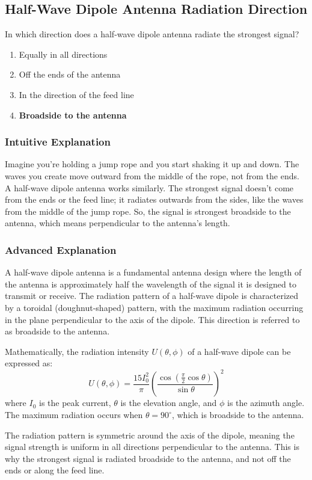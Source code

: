 \subsection{Half-Wave Dipole Antenna Radiation Direction}
\label{T9A10}

\begin{tcolorbox}[colback=gray!10!white,colframe=black!75!black,title=T9A10]
In which direction does a half-wave dipole antenna radiate the strongest signal?
\begin{enumerate}[label=\Alph*)]
    \item Equally in all directions
    \item Off the ends of the antenna
    \item In the direction of the feed line
    \item \textbf{Broadside to the antenna}
\end{enumerate}
\end{tcolorbox}

\subsubsection*{Intuitive Explanation}
Imagine you’re holding a jump rope and you start shaking it up and down. The waves you create move outward from the middle of the rope, not from the ends. A half-wave dipole antenna works similarly. The strongest signal doesn’t come from the ends or the feed line; it radiates outwards from the sides, like the waves from the middle of the jump rope. So, the signal is strongest broadside to the antenna, which means perpendicular to the antenna’s length.

\subsubsection*{Advanced Explanation}
A half-wave dipole antenna is a fundamental antenna design where the length of the antenna is approximately half the wavelength of the signal it is designed to transmit or receive. The radiation pattern of a half-wave dipole is characterized by a toroidal (doughnut-shaped) pattern, with the maximum radiation occurring in the plane perpendicular to the axis of the dipole. This direction is referred to as broadside to the antenna.

Mathematically, the radiation intensity \( U(\theta, \phi) \) of a half-wave dipole can be expressed as:
\[
U(\theta, \phi) = \frac{15 I_0^2}{\pi} \left( \frac{\cos\left(\frac{\pi}{2} \cos \theta\right)}{\sin \theta} \right)^2
\]
where \( I_0 \) is the peak current, \( \theta \) is the elevation angle, and \( \phi \) is the azimuth angle. The maximum radiation occurs when \( \theta = 90^\circ \), which is broadside to the antenna.

The radiation pattern is symmetric around the axis of the dipole, meaning the signal strength is uniform in all directions perpendicular to the antenna. This is why the strongest signal is radiated broadside to the antenna, and not off the ends or along the feed line.

